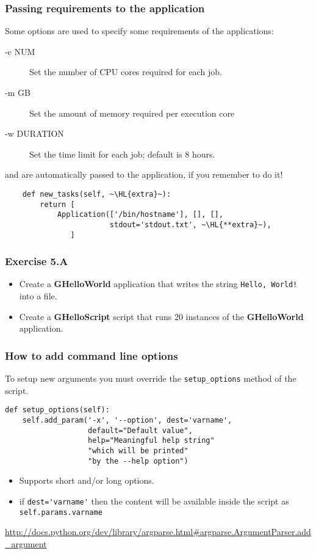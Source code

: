 \documentclass[english,serif,mathserif,xcolor=pdftex,dvipsnames,table]{beamer}
\begin{document}
\begin{frame}[fragile]
  \frametitle{Passing requirements to the application}
  Some options are used to specify some requirements of the applications:
  \begin{description}
  \item[-c NUM] Set the number of CPU cores required for each job.
  \item[-m GB] Set the amount of memory required per execution core
  \item[-w DURATION] Set the time limit for each job; default is 8
    hours.
  \end{description}

  \pause
  and are automatically passed to the application, if you remember to
  do it!
  \begin{lstlisting}
    def new_tasks(self, ~\HL{extra}~):
        return [
            Application(['/bin/hostname'], [], [],
                        stdout='stdout.txt', ~\HL{**extra}~),
               ]
  \end{lstlisting}
\end{frame}

\begin{frame}[fragile]
  \frametitle{Exercise 5.A}
  \begin{itemize}
  \item Create a \textbf{GHelloWorld} application that writes the
    string \texttt{Hello, World!} into a file.
  \item Create a \textbf{GHelloScript} script that runs 20 instances of
    the \textbf{GHelloWorld} application.
  \end{itemize}
\end{frame}

\begin{frame}[fragile]
  \frametitle{How to add command line options}
  To setup new arguments you must override the \lstinline|setup_options|
  method of the script.

  \begin{lstlisting}[showstringspaces=false]
def setup_options(self):
    self.add_param('-x', '--option', dest='varname',
                   default="Default value",
                   help="Meaningful help string"
                   "which will be printed"
                   "by the --help option")
  \end{lstlisting}

  \begin{itemize}
  \item Supports short and/or long options.
  \item if \lstinline|dest='varname'| then the content will be
    available inside the script as \lstinline|self.params.varname|
  \end{itemize}

  \begin{references}
    \url{http://docs.python.org/dev/library/argparse.html#argparse.ArgumentParser.add_argument}
  \end{references}
\end{frame}
\end{document}
